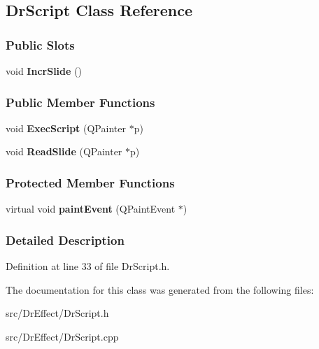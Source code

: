 \hypertarget{classDrScript}{\subsection{\-Dr\-Script \-Class \-Reference}
\label{classDrScript}
}
\subsubsection*{\-Public \-Slots}
\begin{DoxyCompactItemize}
\item 
\hypertarget{classDrScript_a70532654904bf37033660923eec20d03}{void {\bfseries \-Incr\-Slide} ()}\label{classDrScript_a70532654904bf37033660923eec20d03}

\end{DoxyCompactItemize}
\subsubsection*{\-Public \-Member \-Functions}
\begin{DoxyCompactItemize}
\item 
\hypertarget{classDrScript_ad07dfe5f66c1f4e18d5f02ad418db10e}{void {\bfseries \-Exec\-Script} (\-Q\-Painter $\ast$p)}\label{classDrScript_ad07dfe5f66c1f4e18d5f02ad418db10e}

\item 
\hypertarget{classDrScript_a4e36cec6c1334987ee4466ad67b9a959}{void {\bfseries \-Read\-Slide} (\-Q\-Painter $\ast$p)}\label{classDrScript_a4e36cec6c1334987ee4466ad67b9a959}

\end{DoxyCompactItemize}
\subsubsection*{\-Protected \-Member \-Functions}
\begin{DoxyCompactItemize}
\item 
\hypertarget{classDrScript_ad06d035e601c42cc2a3b9d1229c73d36}{virtual void {\bfseries paint\-Event} (\-Q\-Paint\-Event $\ast$)}\label{classDrScript_ad06d035e601c42cc2a3b9d1229c73d36}

\end{DoxyCompactItemize}


\subsubsection{\-Detailed \-Description}


\-Definition at line 33 of file \-Dr\-Script.\-h.



\-The documentation for this class was generated from the following files\-:\begin{DoxyCompactItemize}
\item 
src/\-Dr\-Effect/\-Dr\-Script.\-h\item 
src/\-Dr\-Effect/\-Dr\-Script.\-cpp\end{DoxyCompactItemize}

